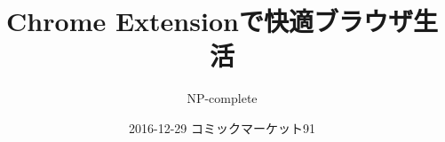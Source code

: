 \title{Chrome Extensionで快適ブラウザ生活}
\author{NP-complete}
\date{2016-12-29 コミックマーケット91}
\Huge
\maketitle
\normalsize
